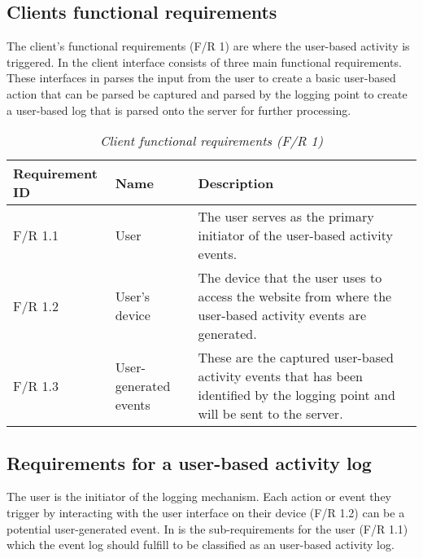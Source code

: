 \clearpage

\subsection{Clients functional requirements}

The client's functional requirements (F/R 1) are where the user-based activity is triggered. In  the client interface consists of three main functional requirements. These interfaces in  parses the input from the user to create a basic user-based action that can be parsed be captured and parsed by the logging point to create a user-based log that is parsed onto the server for further processing. 

\begin{table}[!htb]
	\centering
	\caption[Client functional requirements]
	{\textit{Client functional requirements (F/R 1)}}
	\label{tbl:ch2_clientFunctionalRequirements}
	\begin{tabularx}{\textwidth}{|l|l|X|}
		\hline \textbf{Requirement ID} & \textbf{Name} & \textbf{Description} \\
		\hline F/R 1.1 & User & The user serves as the primary initiator of the user-based activity events.\\
		\hline F/R 1.2 & User's device & The device that the user uses to access the website from where the user-based activity events are generated.\\
		\hline F/R 1.3 & User-generated events & These are the captured user-based activity events that has been identified by the logging point and will be sent to the server.\\
		\hline
	\end{tabularx}
\end{table}

\subsection{Requirements for a user-based activity log}\label{sec:ch2_requirementsOfUAT}
The user is the initiator of the logging mechanism. Each action or event they trigger by interacting with the user interface on their device (F/R 1.2) can be a potential user-generated event. In
 is the sub-requirements for the user (F/R 1.1) which the event log should fulfill to be classified as an user-based activity log.

